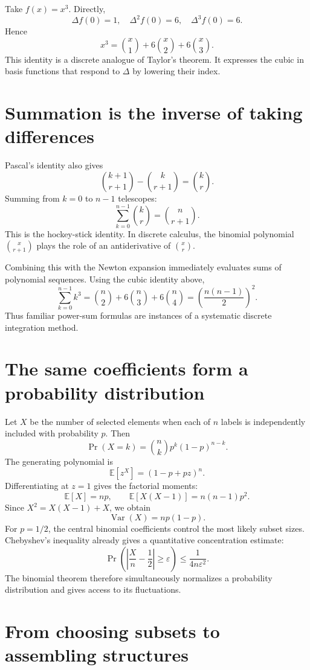 Take \(f(x)=x^3\). Directly,
\[
 \Delta f(0)=1,\quad
 \Delta^2f(0)=6,\quad
 \Delta^3f(0)=6.
\]
Hence
\[
 \boxed{x^3=\binom{x}{1}+6\binom{x}{2}+6\binom{x}{3}.}
\]
This identity is a discrete analogue of Taylor's theorem. It expresses the cubic in basis functions that respond to \(\Delta\) by lowering their index.

\section{Summation is the inverse of taking differences}

Pascal's identity also gives
\[
 \binom{k+1}{r+1}-\binom{k}{r+1}=\binom{k}{r}.
\]
Summing from \(k=0\) to \(n-1\) telescopes:
\[
 \boxed{\sum_{k=0}^{n-1}\binom{k}{r}=\binom{n}{r+1}.}
\]
This is the hockey-stick identity. In discrete calculus, the binomial polynomial \(\binom{x}{r+1}\) plays the role of an antiderivative of \(\binom{x}{r}\).

Combining this with the Newton expansion immediately evaluates sums of polynomial sequences. Using the cubic identity above,
\[
 \sum_{k=0}^{n-1}k^3
 =\binom n2+6\binom n3+6\binom n4
 =\left(\frac{n(n-1)}2\right)^2.
\]
Thus familiar power-sum formulas are instances of a systematic discrete integration method.

\section{The same coefficients form a probability distribution}

Let \(X\) be the number of selected elements when each of \(n\) labels is independently included with probability \(p\). Then
\[
 \Pr(X=k)=\binom nk p^k(1-p)^{n-k}.
\]
The generating polynomial is
\[
 \mathbb E[z^X]=(1-p+pz)^n.
\]
Differentiating at \(z=1\) gives the factorial moments:
\[
 \mathbb E[X]=np,\qquad
 \mathbb E[X(X-1)]=n(n-1)p^2.
\]
Since \(X^2=X(X-1)+X\), we obtain
\[
 \boxed{\operatorname{Var}(X)=np(1-p).}
\]
For \(p=1/2\), the central binomial coefficients control the most likely subset sizes. Chebyshev's inequality already gives a quantitative concentration estimate:
\[
 \Pr\left(\left|\frac Xn-\frac12\right|\ge\varepsilon\right)
 \le\frac{1}{4n\varepsilon^2}.
\]
The binomial theorem therefore simultaneously normalizes a probability distribution and gives access to its fluctuations.

\section{From choosing subsets to assembling structures}

